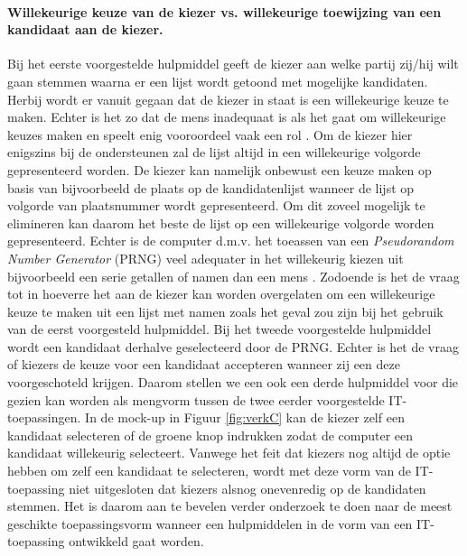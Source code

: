 \paragraph{Willekeurige keuze van de kiezer vs. willekeurige toewijzing van een kandidaat aan de kiezer.} Bij het eerste voorgestelde hulpmiddel geeft de kiezer aan welke partij zij/hij wilt gaan stemmen waarna er een lijst wordt getoond met mogelijke kandidaten. Herbij wordt er vanuit gegaan dat de kiezer in staat is een willekeurige keuze te maken. Echter is het zo dat de mens inadequaat is als het gaat om willekeurige keuzes maken en speelt enig vooroordeel vaak een rol \cite{schulz2012analysing,bar1991perception,neuringer1986can}. Om de kiezer hier enigszins bij de ondersteunen zal de lijst altijd in een willekeurige volgorde gepresenteerd worden.  De kiezer kan namelijk onbewust een keuze maken op basis van bijvoorbeeld de plaats op de kandidatenlijst wanneer de lijst op volgorde van plaatsnummer wordt gepresenteerd. Om dit zoveel mogelijk te elimineren kan daarom het beste de lijst op een willekeurige volgorde worden gepresenteerd. Echter is de computer d.m.v. het toeassen van een \textit{Pseudorandom Number Generator} (PRNG) veel adequater in het willekeurig kiezen uit bijvoorbeeld een serie getallen of namen dan een mens \cite{lewis1969pseudo,RANDO99:online,matsumoto1998mersenne,rukhin2001statistical}. Zodoende is het de vraag tot in hoeverre het aan de kiezer kan worden overgelaten om een willekeurige keuze te maken uit een lijst met namen zoals het geval zou zijn bij het gebruik van de eerst voorgesteld hulpmiddel. Bij het tweede voorgestelde hulpmiddel wordt  een kandidaat derhalve geselecteerd door de PRNG. Echter is het de vraag of kiezers de keuze voor een kandidaat accepteren wanneer zij een deze voorgeschoteld krijgen. Daarom stellen we een ook een derde hulpmiddel voor die gezien kan worden als mengvorm tussen de twee eerder voorgestelde IT-toepassingen. In de mock-up in Figuur \ref{fig:verkC} kan de kiezer zelf een kandidaat selecteren of de groene knop indrukken zodat de computer een kandidaat willekeurig selecteert. Vanwege het feit dat kiezers nog altijd de optie hebben om zelf een kandidaat te selecteren, wordt met deze vorm van de IT-toepassing niet uitgesloten dat kiezers alsnog onevenredig op de kandidaten stemmen. Het is daarom aan te bevelen verder onderzoek te doen naar de meest geschikte toepassingsvorm wanneer een hulpmiddelen in de vorm van een IT-toepassing ontwikkeld gaat worden.  

